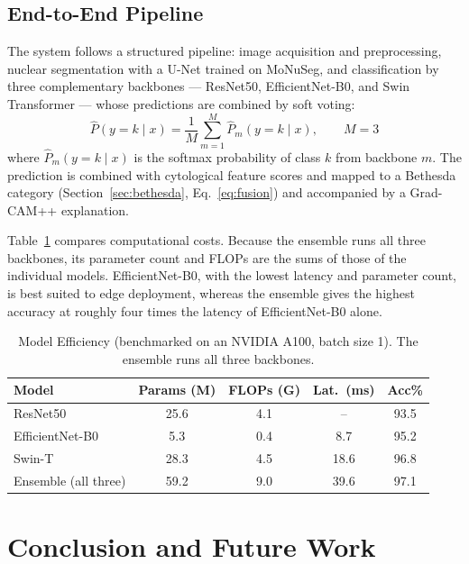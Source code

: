 \documentclass[runningheads]{llncs}
\begin{document}
\subsection{End-to-End Pipeline}

The system follows a structured pipeline: image acquisition and preprocessing, nuclear segmentation with a U-Net trained on MoNuSeg, and classification by three complementary backbones --- ResNet50, EfficientNet-B0, and Swin Transformer --- whose predictions are combined by soft voting:
\begin{equation}
    \hat{P}(y=k \mid x)=\frac{1}{M}\sum_{m=1}^{M}\hat{P}_m(y=k \mid x), \qquad M=3
    \label{eq:ensemble}
\end{equation}
where $\hat{P}_m(y=k \mid x)$ is the softmax probability of class $k$ from backbone $m$. The prediction is combined with cytological feature scores and mapped to a Bethesda category (Section~\ref{sec:bethesda}, Eq.~\ref{eq:fusion}) and accompanied by a Grad-CAM++ explanation.

Table~\ref{tab:efficiency} compares computational costs. Because the ensemble runs all three backbones, its parameter count and FLOPs are the sums of those of the individual models. EfficientNet-B0, with the lowest latency and parameter count, is best suited to edge deployment, whereas the ensemble gives the highest accuracy at roughly four times the latency of EfficientNet-B0 alone.

\begin{table}[t]
\caption{Model Efficiency (benchmarked on an NVIDIA A100, batch size 1). The ensemble runs all three backbones.}
\label{tab:efficiency}
\centering
\begin{tabular}{lcccc}
\toprule
\textbf{Model} & \textbf{Params (M)} & \textbf{FLOPs (G)} & \textbf{Lat.\ (ms)} & \textbf{Acc\%}\\
\midrule
ResNet50        & 25.6 & 4.1 & --   & 93.5\\
EfficientNet-B0 & 5.3  & 0.4 & 8.7  & 95.2\\
Swin-T          & 28.3 & 4.5 & 18.6 & 96.8\\
Ensemble (all three) & 59.2 & 9.0 & 39.6 & 97.1\\
\bottomrule
\end{tabular}
\end{table}

\section{Conclusion and Future Work}
\label{sec:conclusion}
\end{document}
